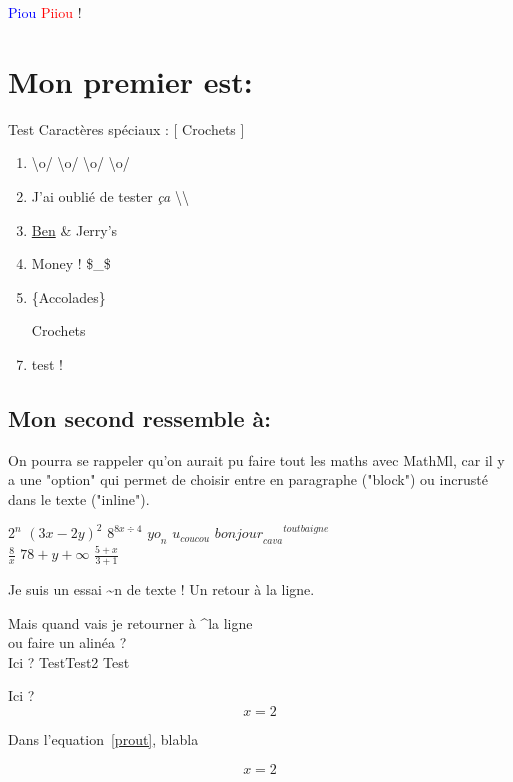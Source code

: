 \documentclass[10pt,a4paper]{report}
\begin{document}
\textcolor{blue}{Piou} \textcolor{red}{Piiou} !

\section{Mon premier est:}        

Test Caractères spéciaux : [ Crochets ]
\begin{enumerate}
\item \textbackslash o/ \textbackslash o/ \textbackslash o/ \textbackslash o/
\item J'ai oublié de tester \textit{ça} \textbackslash\textbackslash
\item \underline{Ben} \& Jerry's
\item Money ! \$\_\$
\item \{Accolades\}
\item [Crochets]
\item test !
\end{enumerate}

\subsection{Mon second ressemble à:}


On pourra se rappeler qu'on aurait pu faire tout les maths avec MathMl, car il y a une "option" qui permet de choisir entre en paragraphe ("block") ou incrusté dans le texte ("inline").

$ 2^n $
$ (3x - 2y)^2 $
$ 8^{8x \div 4} $
$ {yo}_n $
$ u_{coucou} $
$ {{bonjour}_{ca va}}^{tout baigne} $
\\
$ \frac{8}{x} $
$ 78+y+\infty $
$ \frac{5+x}{3+1} $

Je suis un essai \textasciitilde n de texte !
Un retour à la ligne.




Mais quand vais je retourner à \textasciicircum la ligne\\ ou faire un alinéa ?\\
Ici ? Test\newline Test2
Test

Ici ?
\begin{equation}
\label{prout}
x = 2
\end{equation}

Dans l'equation~\eqref{prout}, blabla

\begin{equation*}
\label{eq:2}
x = 2
\end{equation*}
\end{document}
